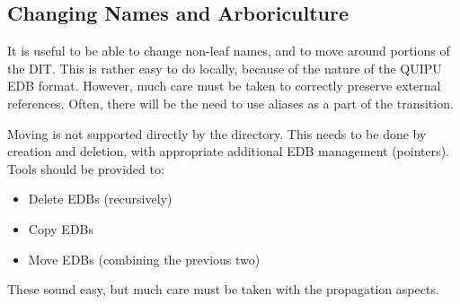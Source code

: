 \subsection {Changing Names and Arboriculture}

It is useful to be able to change non-leaf names, and to move around
portions of the DIT.  This is rather easy to do locally, because of the
nature of the QUIPU EDB format.  However, much care must be taken to
correctly preserve external references.  Often, there will be the need to
use aliases as a part of the transition.

Moving is not supported directly by the directory.  This needs to be done by 
creation and deletion, with appropriate additional EDB management (pointers).
Tools should be provided to:

\begin {itemize}
\item Delete EDBs (recursively)
\item Copy EDBs
\item Move EDBs (combining the previous two)
\end {itemize}

These sound easy, but much care must be taken with the propagation aspects.

